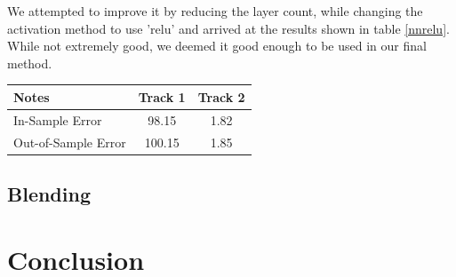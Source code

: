 \documentclass[a4paper, 12pt]{article}
\begin{document}
\begin{multicols}{2}
            We attempted to improve it by reducing the layer count, while changing the activation method to use 'relu' and arrived at the results shown in table \ref{nnrelu}. While not extremely good, we deemed it good enough to be used in our final method.

            \begin{center}
                \begin{tabular}{l|cc}
                    Notes & Track 1 & Track 2 \\
                    \hline
                    In-Sample Error & 98.15 & 1.82 \\
                    Out-of-Sample Error & 100.15 & 1.85 \\
                \end{tabular}
                \label{nnrelu}
            \end{center}

            \subsection{Blending}

        \section{Conclusion}

  \end{multicols}

\vskip 5cm
{}

\end{document}
